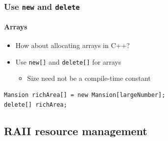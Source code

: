 \documentclass[table]{beamer}
\newcounter{rulecount}
\newcommand{\declarerule}{\textbf{\color{themeblue}{Rule \therulecount:}} }
\begin{document}
\begin{frame}[fragile]
    \frametitle{\declarerule Use \texttt{new} and \texttt{delete} }
    \framesubtitle{Arrays}
    \begin{itemize}
        \item How about allocating arrays in C++?
        \item Use \texttt{new[]} and \texttt{delete[]} for arrays 
            \begin{itemize}
                \item Size need not be a compile-time constant
            \end{itemize}
    \end{itemize}
    \begin{lstlisting}[title=Dynamically allocating an array of objects in C++]
Mansion richArea[] = new Mansion[largeNumber];
delete[] richArea;
    \end{lstlisting}
\end{frame}


\subsection{RAII resource management}
\frame{\subsectionpage}
\end{document}
